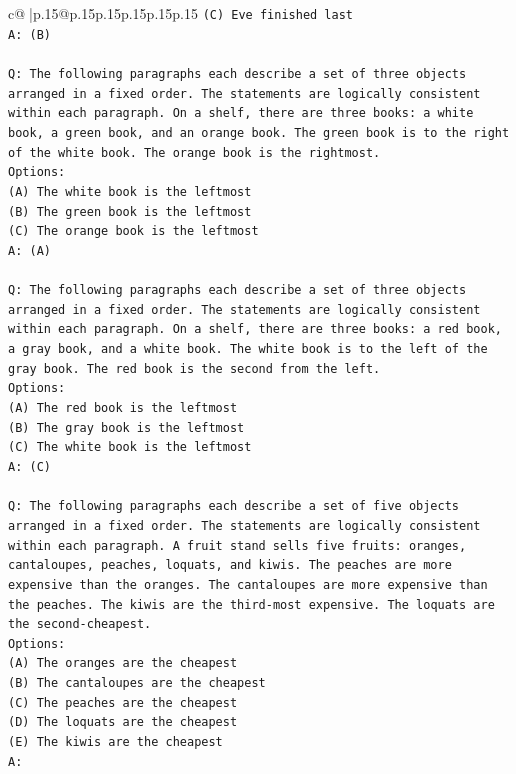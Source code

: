 \documentclass{article}
\begin{document}
{\begin{supertabular}{c@{$\;$}|p{.15\linewidth}@{}p{.15\linewidth}p{.15\linewidth}p{.15\linewidth}p{.15\linewidth}p{.15\linewidth}}
{{{\texttt{(C) Eve finished last} \\
\texttt{A: (B)} \\
\\ 
\texttt{Q: The following paragraphs each describe a set of three objects arranged in a fixed order. The statements are logically consistent within each paragraph. On a shelf, there are three books: a white book, a green book, and an orange book. The green book is to the right of the white book. The orange book is the rightmost.} \\
\texttt{Options:} \\
\texttt{(A) The white book is the leftmost} \\
\texttt{(B) The green book is the leftmost} \\
\texttt{(C) The orange book is the leftmost} \\
\texttt{A: (A)} \\
\\ 
\texttt{Q: The following paragraphs each describe a set of three objects arranged in a fixed order. The statements are logically consistent within each paragraph. On a shelf, there are three books: a red book, a gray book, and a white book. The white book is to the left of the gray book. The red book is the second from the left.} \\
\texttt{Options:} \\
\texttt{(A) The red book is the leftmost} \\
\texttt{(B) The gray book is the leftmost} \\
\texttt{(C) The white book is the leftmost} \\
\texttt{A: (C)} \\
\\ 
\texttt{Q: The following paragraphs each describe a set of five objects arranged in a fixed order. The statements are logically consistent within each paragraph. A fruit stand sells five fruits: oranges, cantaloupes, peaches, loquats, and kiwis. The peaches are more expensive than the oranges. The cantaloupes are more expensive than the peaches. The kiwis are the third{-}most expensive. The loquats are the second{-}cheapest.} \\
\texttt{Options:} \\
\texttt{(A) The oranges are the cheapest} \\
\texttt{(B) The cantaloupes are the cheapest} \\
\texttt{(C) The peaches are the cheapest} \\
\texttt{(D) The loquats are the cheapest} \\
\texttt{(E) The kiwis are the cheapest} \\
\texttt{A:} \\
            }
        }
    }
     \\ \\


\end{supertabular}}
\end{document}
